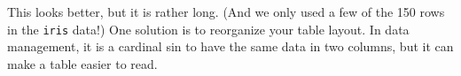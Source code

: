 \documentclass[]{article}
\newenvironment{Shaded}{\begin{snugshade}}{\end{snugshade}}
\newcommand{\DataTypeTok}[1]{\textcolor[rgb]{0.13,0.29,0.53}{#1}}
\newcommand{\DecValTok}[1]{\textcolor[rgb]{0.00,0.00,0.81}{#1}}
\newcommand{\KeywordTok}[1]{\textcolor[rgb]{0.13,0.29,0.53}{\textbf{#1}}}
\newcommand{\NormalTok}[1]{#1}
\newcommand{\OperatorTok}[1]{\textcolor[rgb]{0.81,0.36,0.00}{\textbf{#1}}}
\newcommand{\OtherTok}[1]{\textcolor[rgb]{0.56,0.35,0.01}{#1}}
\newcommand{\StringTok}[1]{\textcolor[rgb]{0.31,0.60,0.02}{#1}}
\begin{document}
This looks better, but it is rather long. (And we only used a few of the
150 rows in the \texttt{iris} data!) One solution is to reorganize your
table layout. In data management, it is a cardinal sin to have the same
data in two columns, but it can make a table easier to read.

\begin{Shaded}
\end{Shaded}

 
  \providecommand{\huxb}[2]{\arrayrulecolor[RGB]{#1}\global\arrayrulewidth=#2pt}
  \providecommand{\huxvb}[2]{\color[RGB]{#1}\vrule width #2pt}
  \providecommand{\huxtpad}[1]{\rule{0pt}{#1}}
  \providecommand{\huxbpad}[1]{\rule[-#1]{0pt}{#1}}
\end{document}
